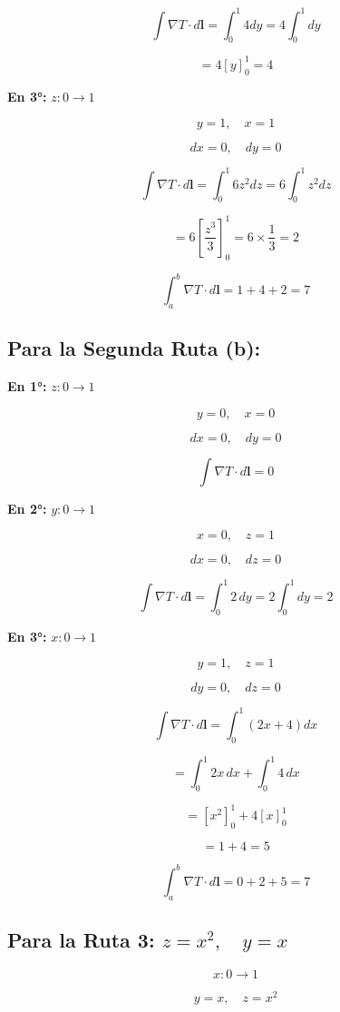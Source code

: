\documentclass[12pt]{article}
\begin{document}
\[
\int \nabla T \cdot d\mathbf{l} = \int_0^1 4 dy = 4 \int_0^1 dy
\]

\[
= 4 \left[ y \right]_0^1 = 4
\]

\textbf{En 3°:} \( z: 0 \to 1 \)

\[
y = 1, \quad x = 1
\]

\[
dx = 0, \quad dy = 0
\]

\[
\int \nabla T \cdot d\mathbf{l} = \int_0^1 6z^2 dz = 6 \int_0^1 z^2 dz
\]

\[
= 6 \left[ \frac{z^3}{3} \right]_0^1 = 6 \times \frac{1}{3} = 2
\]

\[
\int_a^b \nabla T \cdot d\mathbf{l} = 1 + 4 + 2 = \boxed{7}
\]


\subsection*{Para la Segunda Ruta (b):}

\textbf{En 1°:} \( z: 0 \to 1 \)

\[
y = 0, \quad x = 0
\]

\[
dx = 0, \quad dy = 0
\]

\[
\int \nabla T \cdot d\mathbf{l} = 0
\]

\textbf{En 2°:} \( y: 0 \to 1 \)

\[
x = 0, \quad z = 1
\]

\[
dx = 0, \quad dz = 0
\]

\[
\int \nabla T \cdot d\mathbf{l} = \int_0^1 2 \, dy = 2 \int_0^1 dy = 2
\]

\textbf{En 3°:} \( x: 0 \to 1 \)

\[
y = 1, \quad z = 1
\]

\[
dy = 0, \quad dz = 0
\]

\[
\int \nabla T \cdot d\mathbf{l} = \int_0^1 (2x + 4)dx
\]

\[
= \int_0^1 2x \, dx + \int_0^1 4 \, dx
\]

\[
= \left[ x^2 \right]_0^1 + 4 \left[ x \right]_0^1
\]

\[
= 1 + 4 = 5
\]

\[
\int_a^b \nabla T \cdot d\mathbf{l} = 0 + 2 + 5 = \boxed{7}
\]

\subsection*{Para la Ruta 3: \( z = x^2, \quad y = x \)}

\[
x: 0 \to 1
\]

\[
y = x, \quad z = x^2
\]
\end{document}
